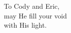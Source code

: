\label{chap:dedication}

\begin{center}
  \null
  \vspace{2.7in}
  \bigskip
  

  To Cody and Eric,\\
  may He fill your void\\
  with His light.\\


  \newpage
\end{center}
